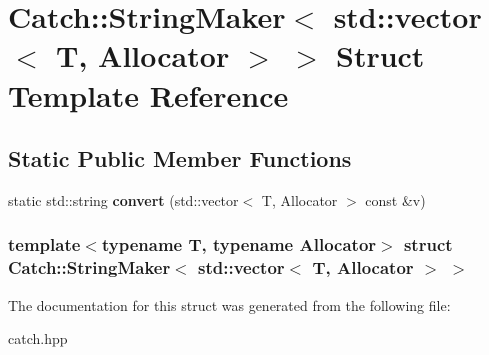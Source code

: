 \hypertarget{structCatch_1_1StringMaker_3_01std_1_1vector_3_01T_00_01Allocator_01_4_01_4}{
\section{Catch::StringMaker$<$ std::vector$<$ T, Allocator $>$ $>$ Struct Template Reference}
\label{structCatch_1_1StringMaker_3_01std_1_1vector_3_01T_00_01Allocator_01_4_01_4}
}
\subsection*{Static Public Member Functions}
\begin{DoxyCompactItemize}
\item 
\hypertarget{structCatch_1_1StringMaker_3_01std_1_1vector_3_01T_00_01Allocator_01_4_01_4_adc7dc716733cea8777497257ae22e62d}{
static std::string {\bfseries convert} (std::vector$<$ T, Allocator $>$ const \&v)}
\label{structCatch_1_1StringMaker_3_01std_1_1vector_3_01T_00_01Allocator_01_4_01_4_adc7dc716733cea8777497257ae22e62d}

\end{DoxyCompactItemize}
\subsubsection*{template$<$typename T, typename Allocator$>$ struct Catch::StringMaker$<$ std::vector$<$ T, Allocator $>$ $>$}



The documentation for this struct was generated from the following file:\begin{DoxyCompactItemize}
\item 
catch.hpp\end{DoxyCompactItemize}
